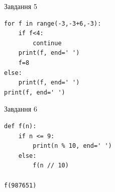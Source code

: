 \documentclass[12pt, ukrainian]{article}
\begin{document}
{\vspace{15mm}
\begin{minipage}[t]{9.7cm}                
{\begin{center}Завдання {5}\end{center}}
\begin{verbatim}
for f in range(-3,-3+6,-3):
    if f<4:
        continue
    print(f, end=' ')
    f=8
else:
    print(f, end=' ')
print(f, end=' ')
\end{verbatim}     
\end{minipage}
\vline \hspace{8mm}
\begin{minipage}[t]{8.0cm}                
{\begin{center}Завдання {6}\end{center}}
\begin{verbatim}
def f(n):
    if n <= 9:
        print(n % 10, end=' ')
    else:
        f(n // 10)

f(987651)
\end{verbatim}     
\end{minipage}

}
\newpage
\end{document}
